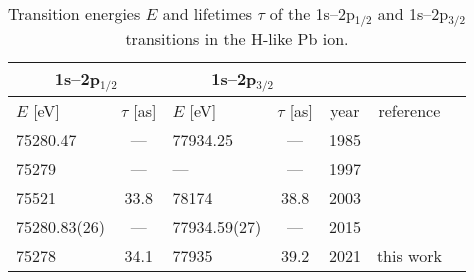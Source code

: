 \begin{table}[htbp!]\centering
    \caption{\normalsize{Transition energies $E$ and lifetimes $\tau$ of the 1s--2p$_{1/2}$ and 1s--2p$_{3/2}$ transitions in the H-like Pb ion.}}
    \begin{tabular}{lc|lc|ccc}
        \hline\hline
        \multicolumn{2}{c}{1s--2p$_{1/2}$} & 
        \multicolumn{2}{c}{1s--2p$_{3/2}$}  \\
        \hline
        $E$ [eV]       &$\tau$ [as] & $E$ [eV] & $\tau$ [as] & year & reference \\
        \hline 
        75280.47     & ---  &  77934.25     & ---  & 1985 &  \cite{JohnsonSoff:1985} \\
        75279        & ---  &  ---          & ---  & 1997 &  \cite{Beier:1997} \\
        75521        & 33.8 &  78174        & 38.8 & 2003 &  \cite{JitrikBunge:2003} \\
        75280.83(26) & ---  &  77934.59(27) & ---  & 2015 &  \cite{YerokhinShabaev:2015} \\
        75278        & 34.1 &  77935        & 39.2 & 2021 & this work \\
        \hline\hline
    \end{tabular}
    \label{table.H-like-Pb}
\end{table}

